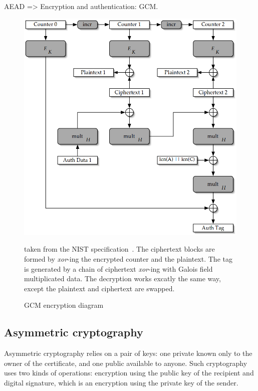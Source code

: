 AEAD => Encryption and authentication: GCM.

\begin{figure}
\includegraphics[width=\textwidth]{nist-gcm-encrypt}
\caption{GCM encryption diagram}{taken from the NIST specification~\cite{mcgrew2005}. The ciphertext blocks are formed by \textit{xor}-ing the encrypted counter and the plaintext. The tag is generated by a chain of ciphertext \textit{xor}-ing with Galois field multiplicated data. The decryption works excatly the same way, except the plaintext and ciphertext are swapped.}
\label{fig:gcm-encrypt}
\end{figure}




\subsection{Asymmetric cryptography}
Asymmetric cryptography relies on a pair of keys: one private known only to the owner of the certificate, and one public available to anyone.
Such cryptography uses two kinds of operations: encryption using the public key of the recipient and digital signature, which is an encryption using the private key of the sender.

